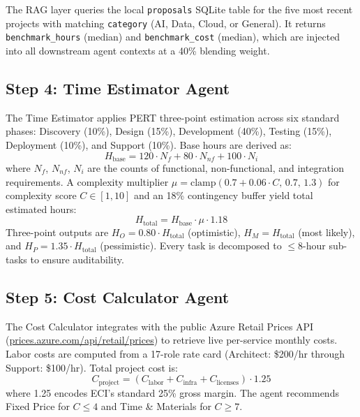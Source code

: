 \documentclass[10pt,twocolumn]{article}
\newcommand{\code}[1]{\texttt{\small #1}}
\begin{document}
The RAG layer queries the local \code{proposals} SQLite table for the
five most recent projects with matching \code{category} (AI, Data, Cloud,
or General). It returns \code{benchmark\_hours} (median) and
\code{benchmark\_cost} (median), which are injected into all downstream
agent contexts at a 40\% blending weight.

\subsection{Step 4: Time Estimator Agent}
\label{sec:time}

The Time Estimator applies PERT three-point estimation across six standard phases:
Discovery (10\%), Design (15\%), Development (40\%), Testing (15\%),
Deployment (10\%), and Support (10\%). Base hours are derived as:
\begin{equation}
H_{\text{base}} = 120 \cdot N_f + 80 \cdot N_{nf} + 100 \cdot N_i
\label{eq:base}
\end{equation}
where $N_f$, $N_{nf}$, $N_i$ are the counts of functional, non-functional,
and integration requirements. A complexity multiplier
$\mu = \text{clamp}(0.7 + 0.06 \cdot C,\, 0.7,\, 1.3)$ for complexity
score $C \in [1,10]$ and an 18\% contingency buffer yield total estimated hours:
\begin{equation}
H_{\text{total}} = H_{\text{base}} \cdot \mu \cdot 1.18
\label{eq:total}
\end{equation}
Three-point outputs are $H_O = 0.80 \cdot H_{\text{total}}$ (optimistic),
$H_M = H_{\text{total}}$ (most likely), and
$H_P = 1.35 \cdot H_{\text{total}}$ (pessimistic).
Every task is decomposed to \(\le\)8-hour sub-tasks to ensure auditability.

\subsection{Step 5: Cost Calculator Agent}

The Cost Calculator integrates with the public Azure Retail Prices API
(\url{prices.azure.com/api/retail/prices}) to retrieve live per-service
monthly costs. Labor costs are computed from a 17-role rate card (Architect:
\$200/hr through Support: \$100/hr). Total project cost is:
\begin{equation}
C_{\text{project}} = (C_{\text{labor}} + C_{\text{infra}} + C_{\text{licenses}}) \cdot 1.25
\label{eq:cost}
\end{equation}
where 1.25 encodes ECI's standard 25\% gross margin. The agent recommends
Fixed Price for $C \le 4$ and Time \& Materials for $C \ge 7$.
\end{document}
